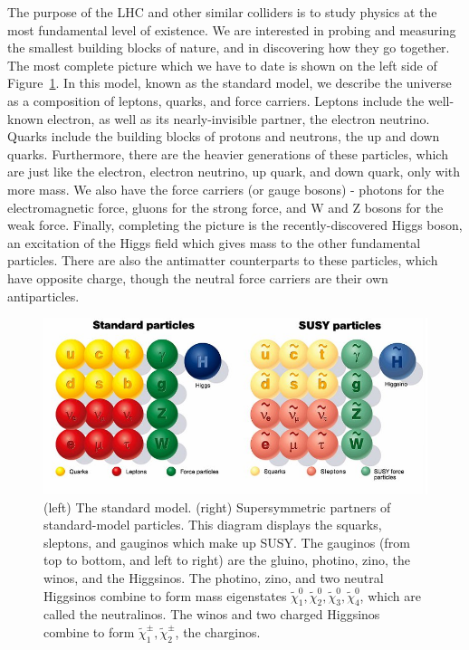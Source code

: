 \documentclass{article}
\begin{document}
The purpose of the LHC and other similar colliders is to study physics at the most fundamental level of existence. We are interested in probing and measuring the smallest building blocks of nature, and in discovering how they go together. The most complete picture which we have to date is shown on the left side of Figure~\ref{SUSY}. In this model, known as the standard model, we describe the universe as a composition of leptons, quarks, and force carriers. Leptons include the well-known electron, as well as its nearly-invisible partner, the electron neutrino. Quarks include the building blocks of protons and neutrons, the up and down quarks. Furthermore, there are the heavier generations of these particles, which are just like the electron, electron neutrino, up quark, and down quark, only with more mass. We also have the force carriers (or gauge bosons) - photons for the electromagnetic force, gluons for the strong force, and W and Z bosons for the weak force. Finally, completing the picture is the recently-discovered Higgs boson, an excitation of the Higgs field which gives mass to the other fundamental particles. There are also the antimatter counterparts to these particles, which have opposite charge, though the neutral force carriers are their own antiparticles.


\begin{figure}[t]
    \centering
    \includegraphics[width=0.7\linewidth]{images/SUSY.png}
    \caption{(left) The standard model. (right) Supersymmetric partners of standard-model particles. This diagram displays the squarks, sleptons, and gauginos which make up SUSY. The gauginos (from top to bottom, and left to right) are the gluino, photino, zino, the winos, and the Higgsinos. The photino, zino, and two neutral Higgsinos combine to form mass eigenstates $\tilde{\chi}^0_1, \tilde{\chi}^0_2, \tilde{\chi}^0_3, \tilde{\chi}^0_4$, which are called the neutralinos. The winos and two charged Higgsinos combine to form $\tilde{\chi}^\pm_1, \tilde{\chi}^\pm_2$, the charginos.}
    \label{SUSY}
\end{figure}
\end{document}

